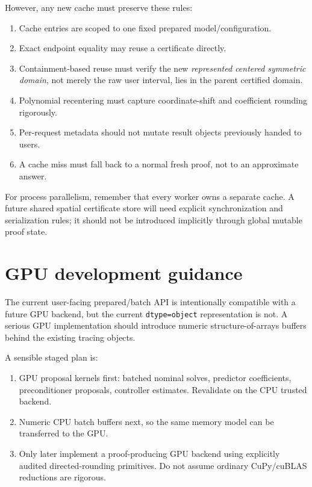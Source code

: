 \documentclass[11pt]{article}
\begin{document}
However, any new cache must preserve these rules:
\begin{enumerate}[leftmargin=*]
\item Cache entries are scoped to one fixed prepared model/configuration.
\item Exact endpoint equality may reuse a certificate directly.
\item Containment-based reuse must verify the new \emph{represented centered
symmetric domain}, not merely the raw user interval, lies in the parent certified
domain.
\item Polynomial recentering must capture coordinate-shift and coefficient
rounding rigorously.
\item Per-request metadata should not mutate result objects previously handed to
users.
\item A cache miss must fall back to a normal fresh proof, not to an approximate
answer.
\end{enumerate}

For process parallelism, remember that every worker owns a separate cache.  A
future shared spatial certificate store will need explicit synchronization and
serialization rules; it should not be introduced implicitly through global
mutable proof state.

\section{GPU development guidance}

The current user-facing prepared/batch API is intentionally compatible with a
future GPU backend, but the current \texttt{dtype=object} representation is not.
A serious GPU implementation should introduce numeric structure-of-arrays buffers
behind the existing tracing objects.

A sensible staged plan is:
\begin{enumerate}[leftmargin=*]
\item GPU proposal kernels first: batched nominal solves, predictor coefficients,
preconditioner proposals, controller estimates.  Revalidate on the CPU trusted
backend.
\item Numeric CPU batch buffers next, so the same memory model can be transferred
to the GPU.
\item Only later implement a proof-producing GPU backend using explicitly audited
directed-rounding primitives.  Do not assume ordinary CuPy/cuBLAS reductions are
rigorous.
\end{enumerate}
\end{document}
